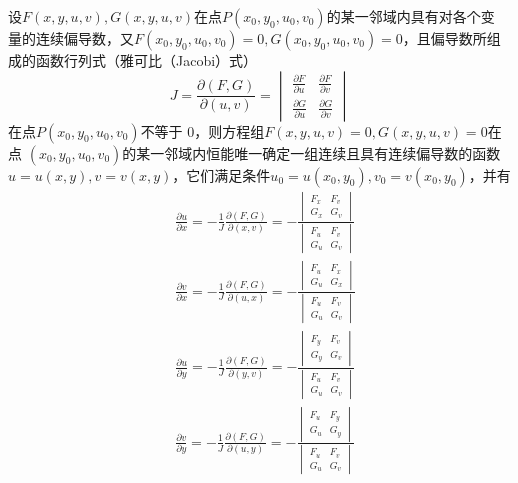 \documentclass[11pt]{article}
\begin{document}
\begin{theorem}[隐函数存在定理 3]
设\(F(x,y,u,v),G(x,y,u,v)\)在点\(P(x_0,y_0,u_0,v_0)\)的某一邻域内具有对各个变
量的连续偏导数，又\(F(x_0,y_0,u_0,v_0)=0,G(x_0,y_0,u_0,v_0)=0\)，且偏导数所组
成的函数行列式（雅可比（Jacobi）式）
\begin{equation*}
J=\frac{\partial(F,G)}{\partial(u,v)}=
\begin{vmatrix}
\frac{\partial F}{\partial u}&\frac{\partial F}{\partial v}\\
\frac{\partial G}{\partial u}&\frac{\partial G}{\partial v}
\end{vmatrix}
\end{equation*}
在点\(P(x_0,y_0,u_0,v_0)\)不等于 0，则方程组\(F(x,y,u,v)=0,G(x,y,u,v)=0\)在点
\((x_0,y_0,u_0,v_0)\)的某一邻域内恒能唯一确定一组连续且具有连续偏导数的函数
\(u=u(x,y),v=v(x,y)\)，它们满足条件\(u_0=u(x_0,y_0),v_0=v(x_0,y_0)\)，并有
\begin{align*}
&\frac{\partial u}{\partial x}=-\frac{1}{J}\frac{\partial (F,G)}{\partial(x,v)}=-\frac{
\begin{vmatrix}
F_x&F_v\\
G_x&G_v
\end{vmatrix}}
{\begin{vmatrix}
F_u&F_v\\
G_u&G_v
 \end{vmatrix}}\\
&\frac{\partial v}{\partial x}=-\frac{1}{J}\frac{\partial (F,G)}{\partial(u,x)}=-\frac{
\begin{vmatrix}
F_u&F_x\\
G_u&G_x
\end{vmatrix}}
{\begin{vmatrix}
F_u&F_v\\
G_u&G_v
 \end{vmatrix}}\\
&\frac{\partial u}{\partial y}=-\frac{1}{J}\frac{\partial (F,G)}{\partial(y,v)}=-\frac{
\begin{vmatrix}
F_y&F_v\\
G_y&G_v
\end{vmatrix}}
{\begin{vmatrix}
F_u&F_v\\
G_u&G_v
 \end{vmatrix}}\\
&\frac{\partial v}{\partial y}=-\frac{1}{J}\frac{\partial (F,G)}{\partial(u,y)}=-\frac{
\begin{vmatrix}
F_u&F_y\\
G_u&G_y
\end{vmatrix}}
{\begin{vmatrix}
F_u&F_v\\
G_u&G_v
 \end{vmatrix}}\\
\end{align*}
\end{theorem}
\end{document}
